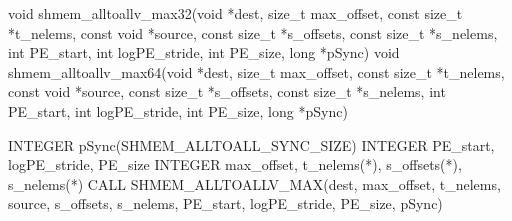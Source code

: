 
\begin{apidefinition}

\begin{Csynopsis}
void shmem_alltoallv_max32(void *dest, size_t max_offset, const size_t *t_nelems, const void *source, const size_t *s_offsets, const size_t *s_nelems, int PE_start, int logPE_stride, int PE_size, long *pSync)
void shmem_alltoallv_max64(void *dest, size_t max_offset, const size_t *t_nelems, const void *source, const size_t *s_offsets, const size_t *s_nelems, int PE_start, int logPE_stride, int PE_size, long *pSync)
\end{Csynopsis}

\begin{Fsynopsis}
INTEGER pSync(SHMEM_ALLTOALL_SYNC_SIZE)
INTEGER PE_start, logPE_stride, PE_size
INTEGER max_offset, t_nelems(*), s_offsets(*), s_nelems(*)
CALL SHMEM_ALLTOALLV_MAX(dest, max_offset, t_nelems, source, s_offsets, s_nelems, PE_start, logPE_stride, PE_size, pSync)
\end{Fsynopsis}


\end{apidefinition}
